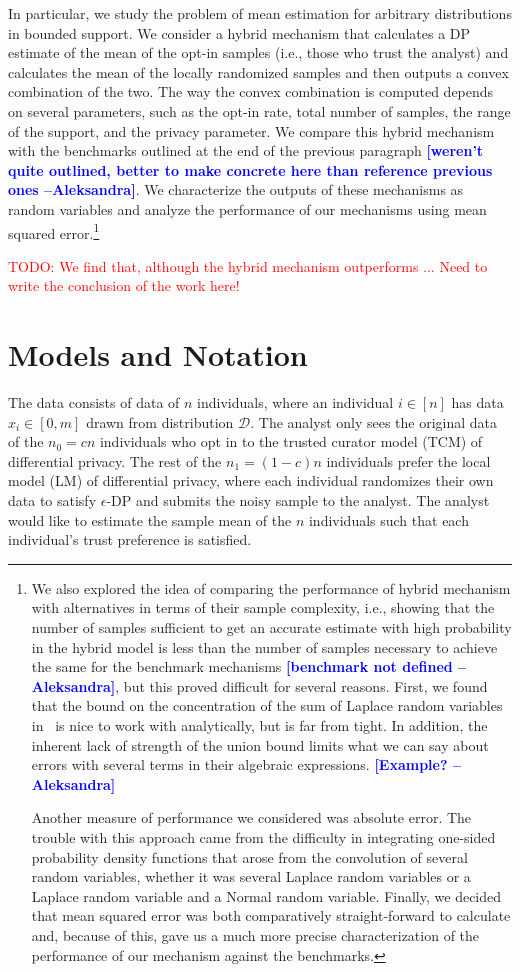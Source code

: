 \documentclass{article}
\newcommand{\ak}[1]{\textcolor{blue}{\bf\small [#1 --Aleksandra]}}
\newcommand\TODO[1]{\textcolor{red}{TODO: {#1}}}
\theoremstyle{plain}
\begin{document}
In particular, we study the problem of mean estimation for arbitrary distributions in bounded support. We consider a hybrid mechanism that calculates a DP estimate of the mean of the opt-in samples (i.e., those who trust the analyst) and calculates the mean of the locally randomized samples and then outputs a convex combination of the two. The way the convex combination is computed depends on several parameters, such as the opt-in rate, total number of samples, the range of the support, and the privacy parameter. We compare this hybrid mechanism with the benchmarks outlined at the end of the previous paragraph \ak{weren't quite outlined, better to make concrete here than reference previous ones}. We characterize the outputs of these mechanisms as random variables and analyze the performance of our mechanisms using mean squared error.\footnote{We also explored the idea of comparing the performance of hybrid mechanism with alternatives in terms of their sample complexity, i.e., showing that the number of samples sufficient to get an accurate estimate with high probability in the hybrid model is less than the number of samples necessary to achieve the same for the benchmark mechanisms \ak{benchmark not defined}, but this proved difficult for several reasons. First, we found that the bound on the concentration of the sum of Laplace random variables in~\cite{Chan:2011:PCR:2043621.2043626} is nice to work with analytically, but is far from tight. In addition, the inherent lack of strength of the union bound limits what we can say about errors with several terms in their algebraic expressions. \ak{Example?} 

Another measure of performance we considered was absolute error. The trouble with this approach came from the difficulty in integrating one-sided probability density functions that arose from the convolution of several random variables, whether it was several Laplace random variables or a Laplace random variable and a Normal random variable. Finally, we decided that mean squared error was both comparatively straight-forward to calculate and, because of this, gave us a much more precise characterization of the performance of our mechanism against the benchmarks.}

\TODO{We find that, although the hybrid mechanism outperforms ... Need to write the conclusion of the work here!}

\section{Models and Notation}
The data consists of data of $n$ individuals, where an individual $i \in [n]$ has data $x_i \in [0, m]$ drawn from distribution $\mathcal{D}$. The analyst only sees the original data of the $n_0 = c n$ individuals who opt in to the trusted curator model (TCM) of differential privacy. The rest of the $n_1 = (1-c) n$ individuals prefer the local model (LM) of differential privacy, where each individual randomizes their own data to satisfy $\epsilon$-DP and submits the noisy sample to the analyst. The analyst would like to estimate the sample mean of the $n$ individuals such that each individual's trust preference is satisfied.
\end{document}
